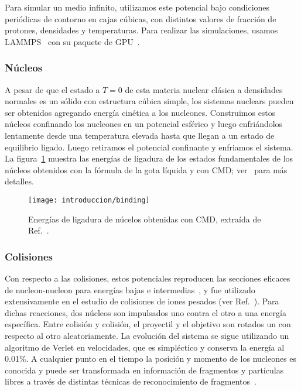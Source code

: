 Para simular un medio infinito, utilizamos este potencial bajo condiciones periódicas de contorno en cajas cúbicas, con distintos valores de fracción de protones, densidades y temperaturas.
Para realizar las simulaciones, usamos LAMMPS~\cite{plimpton_fast_1995} con su paquete de GPU~\cite{brown_implementing_2012}.

\subsubsection{Núcleos}
A pesar de que el estado a $T=0$ de esta materia nuclear clásica a densidades normales es un sólido con estructura cúbica simple, los sistemas nuclears pueden ser obtenidos agregando energía cinética a los nucleones.
Construimos estos núcleos confinando los nucleones en un potencial esférico y luego enfriándolos lentamente desde una temperatura elevada hasta que llegan a un estado de equilibrio ligado.
Luego retiramos el potencial confinante y enfriamos el sistema.
La figura~\ref{fig:binding} muestra las energías de ligadura de los estados fundamentales de los núcleos obtenidos con la fórmula de la gota líquida y con CMD; ver~\cite{dorso_isoscaling_2011} para más detalles.

\begin{figure}[h]
  \centering
  \texttt{[image: introduccion/binding]}
  \caption{Energías de ligadura de núcelos obtenidas con CMD, extraída de Ref.~\cite{dorso_isoscaling_2011}.}
\label{fig:binding}
\end{figure}

\subsubsection{Colisiones}
Con respecto a las colisiones, estos potenciales reproducen las secciones eficaces de nucleon-nucleon para energías bajas e intermedias~\cite{lenk_accuracy_1990}, y fue utilizado extensivamente en el estudio de colisiones de iones pesados (ver Ref.~\cite{chernomoretz_quasiclassical_2002, barranon_time_2007}).
Para dichas reacciones, dos núcleos son impulsados uno contra el otro a una energía específica.
Entre colisión y colisión, el proyectil y el objetivo son rotados un con respecto al otro aleatoriamente.
La evolución del sistema se sigue utilizando un algoritmo de Verlet en velocidades, que es simpléctico y conserva la energía al 0.01\%.
A cualquier punto en el tiempo la posición y momento de los nucleones es conocida y puede ser transformada en información de fragmentos y partículas libres a través de distintas técnicas de reconocimiento de fragmentos~\cite{dorso_early_1993, dorso_when_1995, strachan_time_1997}.


